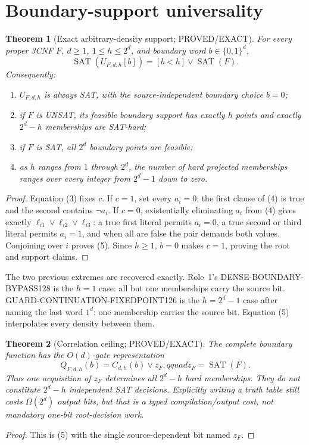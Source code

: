 \documentclass[11pt]{article}
\newtheorem{theorem}{Theorem}
\newcommand{\SAT}{\operatorname{SAT}}
\begin{document}
\section{Boundary-support universality}
\begin{theorem}[Exact arbitrary-density support; PROVED/EXACT]
For every proper 3CNF $F$, $d\ge1$, $1\le h\le2^d$, and boundary word
$b\in\{0,1\}^d$,
\[
 \boxed{\SAT(U_{F,d,h}[b])=[b<h]\vee\SAT(F).}                     \tag{5}
\]
Consequently:
\begin{enumerate}
\item $U_{F,d,h}$ is always SAT, with the source-independent boundary
choice $b=0$;
\item if $F$ is UNSAT, its feasible boundary support has exactly $h$
points and exactly $2^d-h$ memberships are SAT-hard;
\item if $F$ is SAT, all $2^d$ boundary points are feasible;
\item as $h$ ranges from $1$ through $2^d$, the number of hard projected
memberships ranges over every integer from $2^d-1$ down to zero.
\end{enumerate}
\end{theorem}
\begin{proof}
Equation (3) fixes $c$.  If $c=1$, set every $a_i=0$; the first clause of
(4) is true and the second contains $\neg a_i$.  If $c=0$, existentially
eliminating $a_i$ from (4) gives exactly
$\ell_{i1}\vee\ell_{i2}\vee\ell_{i3}$: a true first literal permits
$a_i=0$, a true second or third literal permits $a_i=1$, and when all are
false the pair demands both values.  Conjoining over $i$ proves (5).  Since
$h\ge1$, $b=0$ makes $c=1$, proving the root and support claims.
\end{proof}

The two previous extremes are recovered exactly.  Role~1's
DENSE-BOUNDARY-BYPASS128 is the $h=1$ case: all but one memberships carry
the source bit.  GUARD-CONTINUATION-FIXEDPOINT126 is the
$h=2^d-1$ case after naming the last word $1^d$: one membership carries the
source bit.  Equation (5) interpolates every density between them.

\begin{theorem}[Correlation ceiling; PROVED/EXACT]
The complete boundary function has the $O(d)$-gate representation
\[
 Q_{F,d,h}(b)=C_{d,h}(b)\vee z_F,qquad z_F=\SAT(F).                \tag{6}
\]
Thus one acquisition of $z_F$ determines all $2^d-h$ hard memberships.
They do not constitute $2^d-h$ independent SAT decisions.  Explicitly
writing a truth table still costs $\Omega(2^d)$ output bits, but that is a
typed compilation/output cost, not mandatory one-bit root-decision work.
\end{theorem}
\begin{proof}
This is (5) with the single source-dependent bit named $z_F$.
\end{proof}
\end{document}
